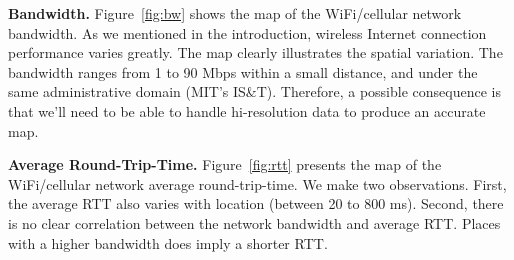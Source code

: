 {\bfseries Bandwidth.}
Figure~\ref{fig:bw} shows the map of the WiFi/cellular network bandwidth.
As we mentioned in the introduction, wireless Internet connection performance 
varies greatly. The map clearly illustrates the spatial variation. The bandwidth
ranges from 1 to 90 Mbps within a small distance, and under the same administrative
domain (MIT's IS\&T). Therefore, a possible consequence is that we'll need to 
be able to handle hi-resolution data to produce an accurate map.

{\bfseries Average Round-Trip-Time.}
Figure~\ref{fig:rtt} presents the map of the WiFi/cellular network average
round-trip-time. We make two observations. First, the average RTT also 
varies with location (between 20 to 800 ms). Second, there is no clear 
correlation between the network bandwidth and average RTT. Places with a
higher bandwidth does imply a shorter RTT. 
